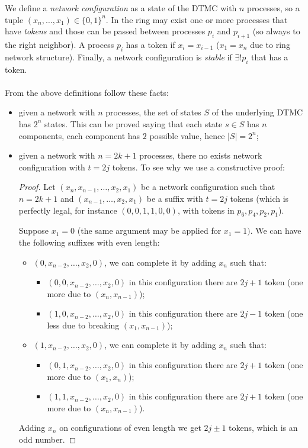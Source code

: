 We define a \emph{network configuration} as a state of the DTMC with
$n$ processes, so a tuple $(x_n, \ldots, x_1) \in \{0,1\}^n$. In the
ring may exist one or more processes that have \emph{tokens} and those
can be passed between processes $p_i$ and $p_{i+1}$ (so always to the
right neighbor). A process $p_i$ has a token if $x_i = x_{i-1}$ ($x_1
= x_n$ due to ring network structure). Finally, a network
configuration is \emph{stable} if $\exists! p_i$ that has a token.
\\\\
From the above definitions follow these facts:
\begin{itemize}
\item given a network with $n$ processes, the set of states $S$ of the
  underlying DTMC has $2^n$ states. This can be proved saying
  that each state $s\in S$ has $n$ components, each component has $2$
  possible value, hence $|S| = 2^n$;
\item given a network with $n = 2k+1$ processes, there no exists
  network configuration with $t=2j$ tokens. To see why we use a
  constructive proof:
  \begin{proof} Let $(x_n,x_{n-1}, \ldots, x_2,x_1)$ be a network
    configuration such that $n=2k+1$ and $(x_{n-1}, \ldots,x_2, x_1)$
    be a suffix with $t=2j$ tokens (which is perfectly legal, for
    instance $(0,0,1,1,0,0)$, with tokens in $p_6, p_4, p_2, p_1$).

    Suppose $x_1 = 0$ (the same argument may be applied for
    $x_1=1)$. We can have the following suffixes with even length:
    \begin{itemize}
    \item $(0,x_{n-2},\ldots, x_2,0)$, we can complete it by adding
      $x_n$ such that:
      \begin{itemize}
      \item $(0,0,x_{n-2},\ldots, x_2, 0)$ in this configuration there
        are $2j+1$ token (one more due to $(x_n,x_{n-1})$);
      \item $(1,0,x_{n-2},\ldots, x_2,0)$ in this configuration there
        are $2j-1$ token (one less due to breaking $(x_1,x_{n-1})$);
      \end{itemize}
    \item $(1,x_{n-2},\ldots, x_2,0)$, we can complete it by adding
      $x_n$ such that:
      \begin{itemize}
      \item $(0,1,x_{n-2},\ldots, x_2, 0)$ in this configuration there
        are $2j+1$ token (one more due to $(x_1,x_n)$);
      \item $(1,1,x_{n-2},\ldots, x_2,0)$ in this configuration there
        are $2j+1$ token (one more due to $(x_n,x_{n-1})$).
      \end{itemize}
    \end{itemize}
    Adding $x_n$ on configurations of even length we get $2j\pm 1 $
    tokens, which is an odd number.
  \end{proof}
\end{itemize}

